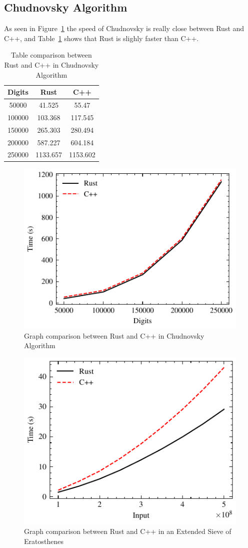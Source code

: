 \documentclass[10pt]{IEEEtran}
\begin{document}
\subsection{Chudnovsky Algorithm}
As seen in Figure~\ref{pi-graph} the speed of Chudnovsky is really close between Rust and C++, and Table~\ref{pi-table} shows that Rust is slighly faster than C++.
\begin{table}[!ht]
    \centering
    \begin{tabular}{|c|cc|}
        \hline
        \rowcolor{lightgray}
            Digits & Rust & C++ \\ \hline
            50000 & 41.525 & 55.47 \\ 
            100000 & 103.368 & 117.545 \\ 
            150000 & 265.303 & 280.494 \\ 
            200000 & 587.227 & 604.184 \\ 
            250000 & 1133.657 & 1153.602 \\ \hline
        \end{tabular}
    \caption{\label{pi-table}Table comparison between Rust and C++ in Chudnovsky Algorithm}
\end{table}
\begin{figure}[h]
    \centering
    \includegraphics{piplot}
    \caption{\label{pi-graph}Graph comparison between Rust and C++ in Chudnovsky Algorithm}
\end{figure}
\begin{figure}[h]
    \centering
    \includegraphics{sieveplot}
    \caption{\label{sieve-graph}Graph comparison between Rust and C++ in an Extended Sieve of Eratosthenes}
\end{figure}

\nocite{*}


\end{document}
